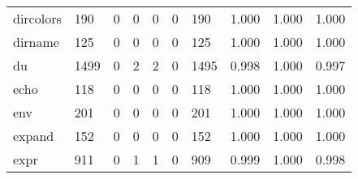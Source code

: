 \begin{longtable}{lp{1.3cm}p{1.3cm}p{1.3cm}p{1.3cm}p{1.3cm}p{1.3cm}p{1.3cm}p{1.3cm}p{1.3cm}}
dircolors &                    190 &                                  0 &                                 0 &                                0 &                                 0 &                             190 &                                   1.000 &                                  1.000 &                                1.000 \\
dirname   &                    125 &                                  0 &                                 0 &                                0 &                                 0 &                             125 &                                   1.000 &                                  1.000 &                                1.000 \\
du        &                   1499 &                                  0 &                                 2 &                                2 &                                 0 &                            1495 &                                   0.998 &                                  1.000 &                                0.997 \\
echo      &                    118 &                                  0 &                                 0 &                                0 &                                 0 &                             118 &                                   1.000 &                                  1.000 &                                1.000 \\
env       &                    201 &                                  0 &                                 0 &                                0 &                                 0 &                             201 &                                   1.000 &                                  1.000 &                                1.000 \\
expand    &                    152 &                                  0 &                                 0 &                                0 &                                 0 &                             152 &                                   1.000 &                                  1.000 &                                1.000 \\
expr      &                    911 &                                  0 &                                 1 &                                1 &                                 0 &                             909 &                                   0.999 &                                  1.000 &                                0.998 \\

\end{longtable}
